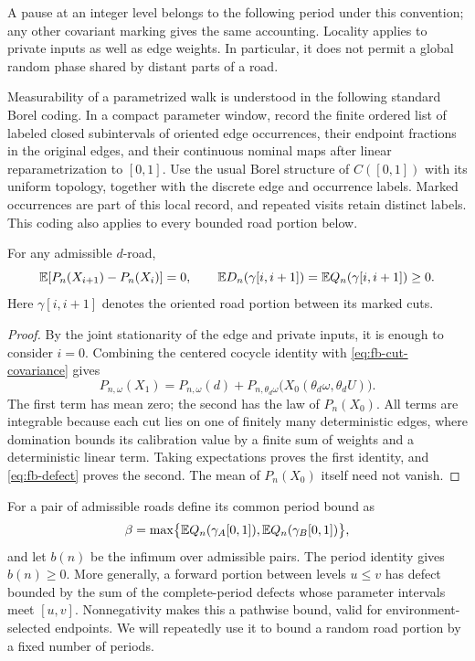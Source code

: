 A pause at an integer level belongs to the following period under
this convention; any other covariant marking gives the same accounting.
Locality applies to private inputs as well as edge weights.  In
particular, it does not permit a global random phase shared by distant
parts of a road.

Measurability of a parametrized walk is understood in the following
standard Borel coding. In a compact parameter window, record the finite
ordered list of labeled closed subintervals of oriented edge occurrences,
their endpoint fractions in the original edges, and their continuous
nominal maps after linear reparametrization to $[0,1]$. Use the usual
Borel structure of $C([0,1])$ with its uniform topology, together with
the discrete edge and occurrence labels. Marked occurrences are part
of this local record, and repeated visits retain distinct labels. This
coding also applies to every bounded road portion below.

\begin{lemma}
\label{lem:fb-random-cuts}
For any admissible $d$-road,
\begin{equation}
 \mathbb E [P_n(X_{i+1})-P_n(X_i)]=0,
 \qquad
 \mathbb E D_n(\gamma[i,i+1])
 =\mathbb E Q_n(\gamma[i,i+1])\ge0.
 \label{eq:fb-period-identity}
\end{equation}
Here $\gamma[i,i+1]$ denotes the oriented road portion between its
marked cuts.
\end{lemma}

\begin{proof}
By the joint stationarity of the edge and private inputs, it is enough
to consider $i=0$.  Combining the
centered cocycle identity with \eqref{eq:fb-cut-covariance} gives
\[
 P_{n,\omega}(X_1)
 =P_{n,\omega}(d)
  +P_{n,\theta_d\omega}
       \bigl(X_0(\theta_d\omega,\theta_dU)\bigr).
\]
The first term has mean zero; the second has the law of $P_n(X_0)$.
All terms are integrable because each cut lies on one of finitely many
deterministic edges, where domination bounds its calibration value by
a finite sum of weights and a deterministic linear term.  Taking
expectations proves the first identity, and \eqref{eq:fb-defect}
proves the second.  The mean of $P_n(X_0)$ itself need not vanish.
\end{proof}

For a pair of admissible roads define its common period bound as
\[
 \beta=\max\bigl\{
 \mathbb E Q_n(\gamma_A[0,1]),
 \mathbb E Q_n(\gamma_B[0,1])\bigr\},
\]
and let $b(n)$ be the infimum over admissible pairs.  The period
identity gives $b(n)\ge0$.  More generally, a forward portion between
levels $u\le v$ has defect bounded by the sum of the complete-period
defects whose parameter intervals meet $[u,v]$.  Nonnegativity makes
this a pathwise bound, valid for environment-selected endpoints.  We
will repeatedly use it to bound a random road portion by a fixed
number of periods.

